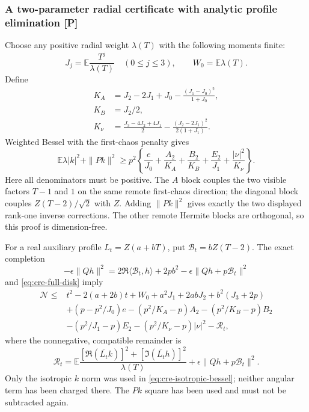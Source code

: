\subsubsection{A two-parameter radial certificate with analytic profile elimination [P]}
Choose any positive radial weight $\lambda(T)$ with the following
moments finite:
\[
 J_j=\mathbb E\frac{T^j}{\lambda(T)}\quad(0\le j\le3),
 \qquad W_0=\mathbb E\lambda(T).
\]
Define
\[
\begin{split}
 K_A&=J_2-2J_1+J_0-\frac{(J_1-J_0)^2}{1+J_0},\\
 K_B&=J_2/2,\\
 K_\nu&=\frac{J_3-4J_2+4J_1}{2}
       -\frac{(J_2-2J_1)^2}{2(1+J_1)}.
\end{split}
\]
Weighted Bessel with the first-chaos penalty gives
\begin{equation}\label{eq:cre-isotropic-bessel}
 \mathbb E\lambda|k|^2+\|Pk\|^2\ge p^2
 \left\{\frac e{J_0}+\frac{A_2}{K_A}+\frac{B_2}{K_B}
             +\frac{E_2}{J_1}+\frac{|\nu|^2}{K_\nu}\right\}.
\end{equation}
Here all denominators must be positive. The $A$ block couples the two
visible factors $T-1$ and $1$ on the same remote first-chaos direction;
the diagonal block couples $Z(T-2)/\sqrt2$ with $Z$. Adding $\|Pk\|^2$
gives exactly the two displayed rank-one inverse corrections. The other
remote Hermite blocks are orthogonal, so this proof is dimension-free.

For a real auxiliary profile $L_t=Z(a+bT)$, put
$\mathcal B_t=bZ(T-2)$. The exact completion
\[
 -\epsilon\|Qh\|^2=2\Re\langle\mathcal B_t,h\rangle+2pb^2
                 -\epsilon\|Qh+p\mathcal B_t\|^2
\]
and \eqref{eq:cre-full-disk} imply
\begin{align*}
 \mathcal N\le{}&t^2-2(a+2b)t+W_0+a^2J_1+2abJ_2+b^2(J_3+2p)\\
 &+(p-p^2/J_0)e-(p^2/K_A-p)A_2-(p^2/K_B-p)B_2\\
 &-(p^2/J_1-p)E_2-(p^2/K_\nu-p)|\nu|^2-\mathcal R_t,
\end{align*}
where the nonnegative, compatible remainder is
\begin{equation}\label{eq:cre-defect}
 \mathcal R_t=
 \mathbb E\frac{[\Re(\overline{L_t}k)]^2+
                    [\Im(\overline{L_t}h)]^2}{\lambda(T)}
       +\epsilon\|Qh+p\mathcal B_t\|^2.
\end{equation}
Only the isotropic $k$ norm was used in
\eqref{eq:cre-isotropic-bessel}; neither angular term has been charged
there. The $Pk$ square has been used and must not be subtracted again.

